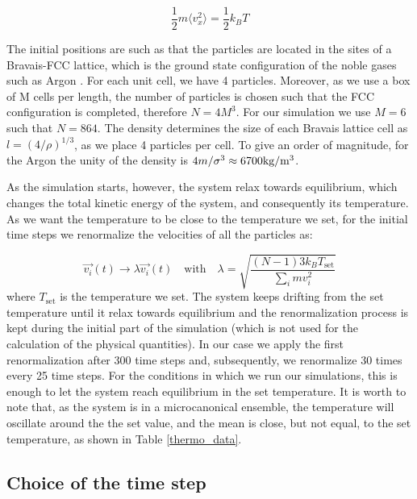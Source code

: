 \documentclass[aps,prl,reprint,groupedaddress]{revtex4-1}
\begin{document}
\begin{equation}
	\frac{1}{2}m \langle v_x^2 \rangle = \frac{1}{2}  k_B T 
\end{equation}

The initial positions are such as that the particles are located in the sites of a Bravais-FCC lattice, which is the ground state configuration of the noble gases such as Argon \cite{ICCPBook}. For each unit cell, we have 4 particles. Moreover, as we use a box of M cells per length, the number of particles is chosen such that the FCC configuration is completed, therefore $N = 4M^3$. For our simulation we use $M=6$ such that $N=864$. The density determines the size of each Bravais lattice cell as $l = (4/\rho)^{1/3}$, as we place 4 particles per cell. To give an order of magnitude, for the Argon the unity of the density is $4m/\sigma^3 \approx 6700 \textup{kg}/\textup{m}^3$.

As the simulation starts, however, the system relax towards equilibrium, which changes the total kinetic energy of the system, and consequently its temperature. As we want the temperature to be close to the temperature we set, for the initial time steps we renormalize the velocities of all the particles as:

\begin{equation}
	\vec{v_i}(t) \to \lambda \vec{v_i}(t) \quad \text{with} \quad \lambda = \sqrt{\frac{(N-1)3k_BT_{\text{set}}}{\sum_i mv_i^2}}
\end{equation}
where $T_{\text{set}}$ is the temperature we set. The system keeps drifting from the set temperature until it relax towards equilibrium and the renormalization process is kept during the initial part of the simulation (which is not used for the calculation of the physical quantities). In our case we apply the first renormalization after 300 time steps and, subsequently, we renormalize 30 times every 25 time steps. For the conditions in which we run our simulations, this is enough to let the system reach equilibrium in the set temperature. It is worth to note that, as the system is in a microcanonical ensemble, the temperature will oscillate around the the set value, and the mean is close, but not equal, to the set temperature, as shown in Table \ref{thermo_data}.

\subsection{Choice of the time step}
\end{document}
